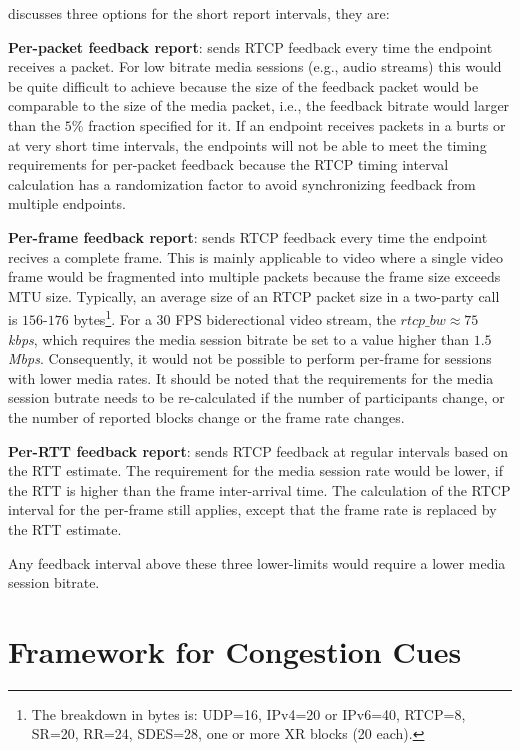 \cite{draft.rmcat.feedback} discusses three options for the short report
intervals, they are:

\textbf{Per-packet feedback report}: sends RTCP feedback every time the
endpoint receives a packet. For low bitrate media sessions (e.g., audio
streams) this would be quite difficult to achieve because the size of the
feedback packet would be comparable to the size of the media packet, i.e., the
feedback bitrate would larger than the $5\%$ fraction specified for it. If an
endpoint receives packets in a burts or at very short time intervals, the
endpoints will not be able to meet the timing requirements for per-packet
feedback because the RTCP timing interval calculation has a randomization
factor to avoid synchronizing feedback from multiple endpoints.

\textbf{Per-frame feedback report}: sends RTCP feedback every time the
endpoint recives a complete frame. This is mainly applicable to video where a
single video frame would be fragmented into multiple packets because the frame
size exceeds MTU size. Typically, an average size of an RTCP packet size in a
two-party call is $156$-$176$ bytes\footnote{The breakdown in bytes is:
UDP=16, IPv4=20 or IPv6=40, RTCP=8, SR=20, RR=24, SDES=28, one or more XR
blocks (20 each).}. For a 30 FPS biderectional video stream, the $rtcp\_bw
\approx 75$ \emph{kbps}, which requires the media session bitrate be set to a
value higher than $1.5$ \emph{Mbps}. Consequently, it would not be possible to
perform per-frame for sessions with lower media rates. It should be noted that
the requirements for the media session butrate needs to be re-calculated if
the number of participants change, or the number of reported blocks change or
the frame rate changes.

\textbf{Per-RTT feedback report}: sends RTCP feedback at regular intervals
based on the RTT estimate. The requirement for the media session rate would be
lower, if the RTT is higher than the frame inter-arrival time. The calculation
of the RTCP interval for the per-frame still applies, except that the frame
rate is replaced by the RTT estimate.

Any feedback interval above these three lower-limits would require a lower
media session bitrate.

\section{Framework for Congestion Cues}
\label{fw.fw}


